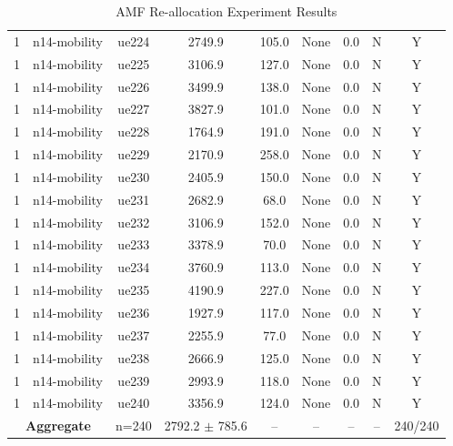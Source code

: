 \begin{table}[ht]
\begin{tabular}{|c|c|c|c|c|c|c|c|c|}
1 & n14-mobility & ue224 & 2749.9 & 105.0 & None & 0.0 & N & Y \\
1 & n14-mobility & ue225 & 3106.9 & 127.0 & None & 0.0 & N & Y \\
1 & n14-mobility & ue226 & 3499.9 & 138.0 & None & 0.0 & N & Y \\
1 & n14-mobility & ue227 & 3827.9 & 101.0 & None & 0.0 & N & Y \\
1 & n14-mobility & ue228 & 1764.9 & 191.0 & None & 0.0 & N & Y \\
1 & n14-mobility & ue229 & 2170.9 & 258.0 & None & 0.0 & N & Y \\
1 & n14-mobility & ue230 & 2405.9 & 150.0 & None & 0.0 & N & Y \\
1 & n14-mobility & ue231 & 2682.9 & 68.0 & None & 0.0 & N & Y \\
1 & n14-mobility & ue232 & 3106.9 & 152.0 & None & 0.0 & N & Y \\
1 & n14-mobility & ue233 & 3378.9 & 70.0 & None & 0.0 & N & Y \\
1 & n14-mobility & ue234 & 3760.9 & 113.0 & None & 0.0 & N & Y \\
1 & n14-mobility & ue235 & 4190.9 & 227.0 & None & 0.0 & N & Y \\
1 & n14-mobility & ue236 & 1927.9 & 117.0 & None & 0.0 & N & Y \\
1 & n14-mobility & ue237 & 2255.9 & 77.0 & None & 0.0 & N & Y \\
1 & n14-mobility & ue238 & 2666.9 & 125.0 & None & 0.0 & N & Y \\
1 & n14-mobility & ue239 & 2993.9 & 118.0 & None & 0.0 & N & Y \\
1 & n14-mobility & ue240 & 3356.9 & 124.0 & None & 0.0 & N & Y \\
\multicolumn{2}{|c|}{\textbf{Aggregate}} & n=240 & 2792.2 $\pm$ 785.6 & -- & -- & -- & -- & 240/240 \\
\hline
\end{tabular}
\caption{AMF Re-allocation Experiment Results}
\label{tab:amf_realloc}
\end{table}
